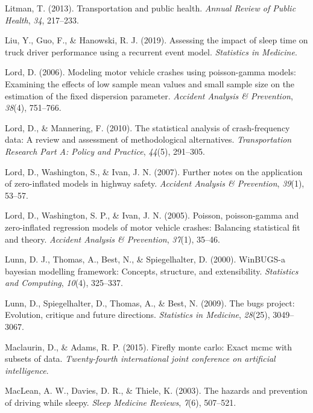 \documentclass[12pt]{book}
\numberwithin{equation}{chapter}
\begin{document}
\leavevmode\hypertarget{ref-litman2013transportation}{}%
Litman, T. (2013). Transportation and public health. \emph{Annual Review of Public Health}, \emph{34}, 217--233.

\leavevmode\hypertarget{ref-liu2019assessing}{}%
Liu, Y., Guo, F., \& Hanowski, R. J. (2019). Assessing the impact of sleep time on truck driver performance using a recurrent event model. \emph{Statistics in Medicine}.

\leavevmode\hypertarget{ref-lord2006modeling}{}%
Lord, D. (2006). Modeling motor vehicle crashes using poisson-gamma models: Examining the effects of low sample mean values and small sample size on the estimation of the fixed dispersion parameter. \emph{Accident Analysis \& Prevention}, \emph{38}(4), 751--766.

\leavevmode\hypertarget{ref-lord2010statistical}{}%
Lord, D., \& Mannering, F. (2010). The statistical analysis of crash-frequency data: A review and assessment of methodological alternatives. \emph{Transportation Research Part A: Policy and Practice}, \emph{44}(5), 291--305.

\leavevmode\hypertarget{ref-lord2007further}{}%
Lord, D., Washington, S., \& Ivan, J. N. (2007). Further notes on the application of zero-inflated models in highway safety. \emph{Accident Analysis \& Prevention}, \emph{39}(1), 53--57.

\leavevmode\hypertarget{ref-lord2005poisson}{}%
Lord, D., Washington, S. P., \& Ivan, J. N. (2005). Poisson, poisson-gamma and zero-inflated regression models of motor vehicle crashes: Balancing statistical fit and theory. \emph{Accident Analysis \& Prevention}, \emph{37}(1), 35--46.

\leavevmode\hypertarget{ref-lunn2000winbugs}{}%
Lunn, D. J., Thomas, A., Best, N., \& Spiegelhalter, D. (2000). WinBUGS-a bayesian modelling framework: Concepts, structure, and extensibility. \emph{Statistics and Computing}, \emph{10}(4), 325--337.

\leavevmode\hypertarget{ref-lunn2009bugs}{}%
Lunn, D., Spiegelhalter, D., Thomas, A., \& Best, N. (2009). The bugs project: Evolution, critique and future directions. \emph{Statistics in Medicine}, \emph{28}(25), 3049--3067.

\leavevmode\hypertarget{ref-maclaurin2015firefly}{}%
Maclaurin, D., \& Adams, R. P. (2015). Firefly monte carlo: Exact mcmc with subsets of data. \emph{Twenty-fourth international joint conference on artificial intelligence}.

\leavevmode\hypertarget{ref-maclean2003hazards}{}%
MacLean, A. W., Davies, D. R., \& Thiele, K. (2003). The hazards and prevention of driving while sleepy. \emph{Sleep Medicine Reviews}, \emph{7}(6), 507--521.
\end{document}
